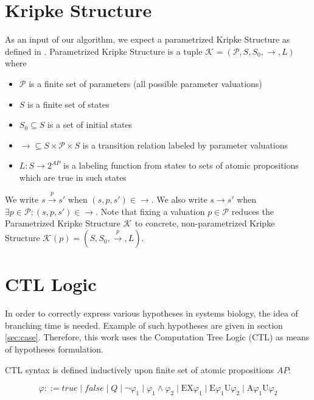\documentclass[12pt,oneside, draft]{fithesis2}
\newcommand{\ks}[1][]{\ensuremath{\mathcal{K}_{#1}}}
\newcommand{\fullKs}{\ensuremath{ \ks = (\params, S, S_0, \trans{}, L) }}
\newcommand{\trans}[1]{\stackrel{#1}{\rightarrow}}
\newcommand{\params}{\mathcal{P}}
\newcommand{\eu}[2]{\ensuremath{\mbox{E} #1 \mbox{U} #2 }}
\newcommand{\au}[2]{\ensuremath{\mbox{A} #1 \mbox{U} #2 }}
\newcommand{\ex}[1]{\ensuremath{\mbox{EX} #1}}
\begin{document}
		\section{Kripke Structure}
	
			As an input of our algorithm, we expect a parametrized Kripke Structure as defined in \cite{ieee}. Parametrized Kripke Structure is a tuple $\fullKs$ where
			
			\begin{itemize}
				\item $\params$ is a finite set of parameters (all possible parameter valuations)
				\item $S$ is a finite set of states
				\item $S_0 \subseteq S$ is a set of initial states
				\item $\trans{} \subseteq S \times \params \times S$ is a transition relation labeled by parameter valuations 
				\item $L: S \rightarrow 2^{AP} $ is a labeling function from states to sets of atomic propositions which are true in such states
			\end{itemize} 		
			
			We write $ s \trans{p} s' $ when $ (s, p, s') \in \trans{} $. We also write $ s \trans{} s'$ when $\exists p \in \params : (s, p, s') \in \trans{} $. Note that fixing a valuation $p \in \params$ reduces the Parametrized Kripke Structure $\ks$ to concrete, non-parametrized Kripke Structure $\ks(p) = (S, S_0, \trans{p}, L)$.
						
		\section{CTL Logic}
		
			In order to correctly express various hypotheses in systems biology, the idea of branching time is needed. Example of such hypotheses are given in section \ref{sec:case}. Therefore, this work uses the Computation Tree Logic (CTL) as means of hypotheses formulation. 

			CTL syntax is defined inductively upon finite set of atomic propositions $AP$:
			
			\begin{equation}
				\varphi ::= 
					true \mid
					false \mid
					Q \mid 
					\neg \varphi_1 \mid 
					\varphi_1 \wedge \varphi_2 \mid
					\ex{\varphi_1} \mid
					\eu{\varphi_1}{\varphi_2} \mid
					\au{\varphi_1}{\varphi_2}			
			\end{equation}
			
\end{document}
